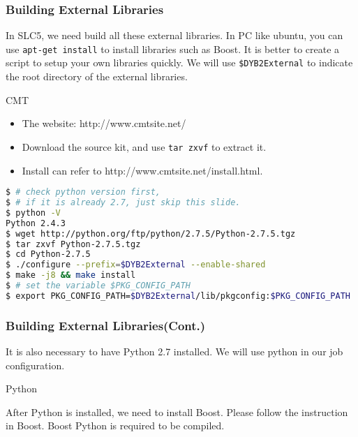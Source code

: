 \begin{frame}
    \frametitle{Building External Libraries}
    In SLC5, we need build all these external libraries.
    In PC like ubuntu, you can use {\tt apt-get install} to install
    libraries such as Boost.
    It is better to create a script to setup your own
    libraries quickly.
    We will use {\tt \$DYB2External} to indicate the root directory
    of the external libraries.
    \begin{block}{CMT}
        \begin{itemize}
            \item The website: http://www.cmtsite.net/
            \item Download the source kit, and use 
                {\tt tar zxvf} to extract it.
            \item Install can refer to 
                http://www.cmtsite.net/install.html.
        \end{itemize}
        \par\usebox{\installcmt}
    \end{block}
\end{frame}

\newsavebox{\installpython}
\begin{lrbox}{\installpython}
\begin{lstlisting}[language=bash]
$ # check python version first, 
$ # if it is already 2.7, just skip this slide.
$ python -V
Python 2.4.3
$ wget http://python.org/ftp/python/2.7.5/Python-2.7.5.tgz
$ tar zxvf Python-2.7.5.tgz 
$ cd Python-2.7.5
$ ./configure --prefix=$DYB2External --enable-shared
$ make -j8 && make install
$ # set the variable $PKG_CONFIG_PATH
$ export PKG_CONFIG_PATH=$DYB2External/lib/pkgconfig:$PKG_CONFIG_PATH
\end{lstlisting}
\end{lrbox}

\begin{frame}
    \frametitle{Building External Libraries(Cont.)}
    It is also necessary to have Python 2.7 installed.
    We will use python in our job configuration.

    \begin{block}{Python}
        \par\usebox{\installpython}
    \end{block}

    After Python is installed, we need to install Boost.
    Please follow the instruction in Boost. Boost Python
    is required to be compiled.
\end{frame}

